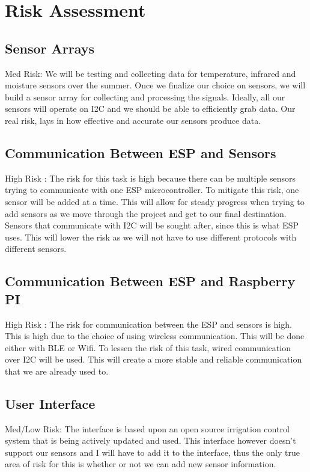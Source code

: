 \documentclass[letterpaper, 10 pt, conference]{ieeeconf}  %
\begin{document}
\section{Risk Assessment}
\subsection{Sensor Arrays}
Med Risk: We will be testing and collecting data for temperature, infrared and moisture sensors over the summer. Once we finalize our choice on sensors, we will build a sensor array for collecting and processing the signals. Ideally, all our sensors will operate on I2C and we should be able to efficiently grab data. Our real risk, lays in how effective and accurate our sensors produce data.

\subsection{Communication Between ESP and Sensors}
High Risk : The risk for this task is high because there can be multiple sensors trying to communicate with one ESP microcontroller. To mitigate this risk, one sensor will be added at a time. This will allow for steady progress when trying to add sensors as we move through the project and get to our final destination. Sensors that communicate with I2C will be sought after, since this is what ESP uses. This will lower the risk as we will not have to use different protocols with different sensors.

\subsection{Communication Between ESP and Raspberry PI}
High Risk : The risk for communication between the ESP and sensors is high. This is high due to the choice of using wireless communication. This will be done either with BLE or Wifi. To lessen the risk of this task, wired communication over I2C will be used. This will create a more stable and reliable communication that we are already used to. 

\subsection{User Interface}
Med/Low Risk: The interface is based upon an open source irrigation control system that is being actively updated and used. This interface however doesn't support our sensors and I will have to add it to the interface, thus the only true area of risk for this is whether or not we can add new sensor information.
\end{document}
